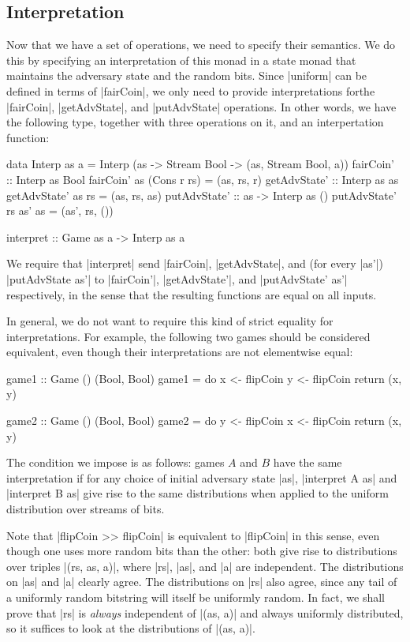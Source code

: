 \subsection{Interpretation}

Now that we have a set of operations, we need to specify their semantics.  We do this by specifying an interpretation of
this monad in a state monad that maintains the adversary state and the random bits.  Since |uniform| can be defined in
terms of |fairCoin|, we only need to provide interpretations forthe |fairCoin|, |getAdvState|, and |putAdvState|
operations.  In other words, we have the following type, together with three operations on it, and an interpertation
function:
\begin{code}
    data Interp as a = Interp (as -> Stream Bool -> (as, Stream Bool, a))
    fairCoin' :: Interp as Bool
    fairCoin' as (Cons r rs) = (as, rs, r)
    getAdvState' :: Interp as as
    getAdvState' as rs = (as, rs, as)
    putAdvState' :: as -> Interp as ()
    putAdvState' rs as' as = (as', rs, ())

    interpret :: Game as a -> Interp as a
\end{code}

We require that |interpret| send |fairCoin|, |getAdvState|, and (for every |as'|) |putAdvState as'| to |fairCoin'|,
|getAdvState'|, and |putAdvState' as'| respectively, in the sense that the resulting functions are equal on all inputs.

In general, we do not want to require this kind of strict equality for interpretations.  For example, the following two
games should be considered equivalent, even though their interpretations are not elementwise equal:
\begin{code}
game1 :: Game () (Bool, Bool)
game1 = do
    x <- flipCoin
    y <- flipCoin
    return (x, y)

game2 :: Game () (Bool, Bool)
game2 = do
    y <- flipCoin
    x <- flipCoin
    return (x, y)
\end{code}

The condition we impose is as follows: games $A$ and $B$ have the same interpretation if for any choice of initial
adversary state |as|, |interpret A as| and |interpret B as| give rise to the same distributions when applied to the
uniform distribution over streams of bits.

Note that |flipCoin >> flipCoin| is equivalent to |flipCoin| in this sense, even though one uses more random bits than
the other: both give rise to distributions over triples |(rs, as, a)|, where |rs|, |as|, and |a| are independent.  The
distributions on |as| and |a| clearly agree.  The distributions on |rs| also agree, since any tail of a uniformly random
bitstring will itself be uniformly random.  In fact, we shall prove that |rs| is \emph{always} independent of |(as, a)|
and always uniformly distributed, so it suffices to look at the distributions of |(as, a)|.

